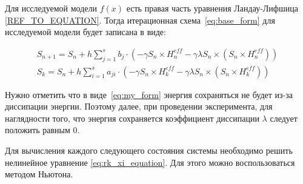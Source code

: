 Для исследуемой модели $f(x)$ есть правая часть уравнения
Ландау-Лифшица \ref{REF_TO_EQUATION}.
Тогда итерационная схема~\ref{eq:base_form} для исследуемой модели
будет записана в виде:

\begin{gather}
    S_{n+1} = S_n + h\sum_{j=1}^s b_j \cdot
    \left(-\gamma S_n \times H^{eff}_n - \gamma\lambda S_n \times
    \left( S_n \times H^{eff}_n\right)\right)
    \label{eq:my_form}\\
    S_{k} = S_n + h\sum_{i=1}^s a_{ji}\cdot \left(
        -\gamma S_n \times H^{eff}_{k} - \gamma\lambda S_n \times
    \left(S_n \times H^{eff}_{k}\right)\right)
    \label{eq:rk_xi_equation}
\end{gather}

\begin{remark}
    Нужно отметить что в виде~\ref{eq:my_form} энергия сохраняться не будет из-за
    диссипации энергии. Поэтому далее, при проведении эксперимента, для наглядности того,
    что энергия сохраняется коэффициент диссипации $\lambda$ следует положить
    равным $0$.
\end{remark}

Для вычисления каждого следующего состояния системы необходимо решить
нелинейное уравнение \ref{eq:rk_xi_equation}. Для этого можно воспользоваться
методом Ньютона.

